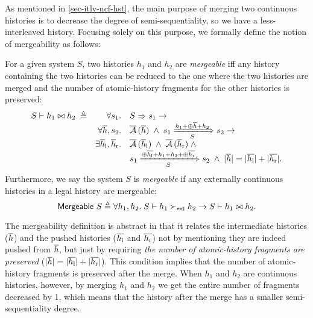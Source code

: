 As mentioned in \autoref{sec-itlv-ncf-hst}, the main purpose of merging two continuous histories is to decrease the degree of semi-sequentiality, so we have a less-interleaved history.
Focusing solely on this purpose, we formally define the notion of mergeability as follows:
\begin{definition}[Mergeability]
  \label{def-mgb}
  For a given system $S$, two histories $h_1$ and $h_2$ are \emph{mergeable} iff any history containing the two histories can be reduced to the one where the two histories are merged and the number of atomic-history fragments for the other histories is preserved:
  \begin{displaymath}
    \begin{array}{rrl}
      \hmgb{S}{h_1}{h_2}\; \triangleq & \forall s_1. & \semrch{S}{s_1} \to\\
      & \forall \listof{h}, s_2. & \atomicHsts{\listof{h}} \;\wedge\;
      \semsteps{S}{s_1}{\listapp{h_1}{\listapp{\listconcat{\listof{h}}}{h_2}}}{s_2} \to\\
      & \exists \listof{h}_{\textrm{l}}, \listof{h}_{\textrm{r}}.
      & \atomicHsts{\listof{h}_{\textrm{l}}} \;\wedge\; \atomicHsts{\listof{h}_{\textrm{r}}} \;\wedge\\
      & & \semsteps{S}{s_1}{\listapp{\listconcat{\listof{h_{\textrm{l}}}}}{\listapp{h_1}{\listapp{h_2}{\listconcat{\listof{h_{\textrm{r}}}}}}}}{s_2} \;\wedge\; \sizeof{\listof{h}} = \sizeof{\listof{h_{\textrm{l}}}} + \sizeof{\listof{h_{\textrm{r}}}}.
    \end{array}
  \end{displaymath}
  Furthermore, we say the system $S$ is \emph{mergeable} if any externally continuous histories in a legal history are mergeable:
  \begin{displaymath}
    \smgb{S} \triangleq \forall h_1, h_2.\; \hextcont{S}{h_1}{h_2} \to \hmgb{S}{h_1}{h_2}.
  \end{displaymath}
\end{definition}

The mergeability definition is abstract in that it relates the intermediate histories ($\listof{h}$) and the pushed histories ($\listof{h_{\textrm{l}}}$ and $\listof{h_{\textrm{r}}}$) not by mentioning they are indeed pushed from $\listof{h}$, but just by requiring \emph{the number of atomic-history fragments are preserved} ($\sizeof{\listof{h}} = \sizeof{\listof{h_{\textrm{l}}}} + \sizeof{\listof{h_{\textrm{r}}}}$).
This condition implies that the number of atomic-history fragments is preserved after the merge.
When $h_1$ and $h_2$ are continuous histories, however, by merging $h_1$ and $h_2$ we get the entire number of fragments decreased by 1, which means that the history after the merge has a smaller semi-sequentiality degree.

